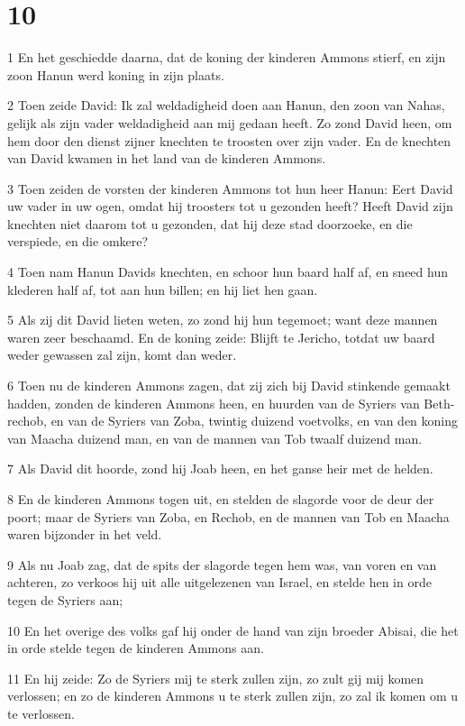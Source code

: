 \chapter{10}

\par 1 En het geschiedde daarna, dat de koning der kinderen Ammons stierf, en zijn zoon Hanun werd koning in zijn plaats.
\par 2 Toen zeide David: Ik zal weldadigheid doen aan Hanun, den zoon van Nahas, gelijk als zijn vader weldadigheid aan mij gedaan heeft. Zo zond David heen, om hem door den dienst zijner knechten te troosten over zijn vader. En de knechten van David kwamen in het land van de kinderen Ammons.
\par 3 Toen zeiden de vorsten der kinderen Ammons tot hun heer Hanun: Eert David uw vader in uw ogen, omdat hij troosters tot u gezonden heeft? Heeft David zijn knechten niet daarom tot u gezonden, dat hij deze stad doorzoeke, en die verspiede, en die omkere?
\par 4 Toen nam Hanun Davids knechten, en schoor hun baard half af, en sneed hun klederen half af, tot aan hun billen; en hij liet hen gaan.
\par 5 Als zij dit David lieten weten, zo zond hij hun tegemoet; want deze mannen waren zeer beschaamd. En de koning zeide: Blijft te Jericho, totdat uw baard weder gewassen zal zijn, komt dan weder.
\par 6 Toen nu de kinderen Ammons zagen, dat zij zich bij David stinkende gemaakt hadden, zonden de kinderen Ammons heen, en huurden van de Syriers van Beth-rechob, en van de Syriers van Zoba, twintig duizend voetvolks, en van den koning van Maacha duizend man, en van de mannen van Tob twaalf duizend man.
\par 7 Als David dit hoorde, zond hij Joab heen, en het ganse heir met de helden.
\par 8 En de kinderen Ammons togen uit, en stelden de slagorde voor de deur der poort; maar de Syriers van Zoba, en Rechob, en de mannen van Tob en Maacha waren bijzonder in het veld.
\par 9 Als nu Joab zag, dat de spits der slagorde tegen hem was, van voren en van achteren, zo verkoos hij uit alle uitgelezenen van Israel, en stelde hen in orde tegen de Syriers aan;
\par 10 En het overige des volks gaf hij onder de hand van zijn broeder Abisai, die het in orde stelde tegen de kinderen Ammons aan.
\par 11 En hij zeide: Zo de Syriers mij te sterk zullen zijn, zo zult gij mij komen verlossen; en zo de kinderen Ammons u te sterk zullen zijn, zo zal ik komen om u te verlossen.
